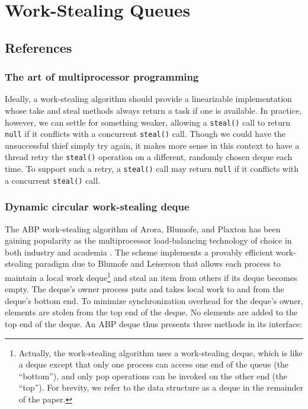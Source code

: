 
\chapter{Work-Stealing Queues}
\label{chap:queues-description}


\section{References}

\subsection{The art of multiprocessor programming \cite{Herlihy2008}}

Ideally, a work-stealing algorithm should provide a linearizable
implementation whose take and steal methods always return a task if
one is available. In practice, however, we can settle for something
weaker, allowing a \lstinline!steal()! call to return \lstinline!null!
if it conflicts with a concurrent \lstinline!steal()! call. Though we
could have the unsuccessful thief simply try again, it makes more
sense in this context to have a thread retry the \lstinline!steal()!
operation on a different, randomly chosen deque each time. To support
such a retry, a \lstinline!steal()! call may return \lstinline!null!
if it conflicts with a concurrent \lstinline!steal()! call.


\subsection{Dynamic circular work-stealing deque \cite{Chase2005}}

The ABP work-stealing algorithm of Arora, Blumofe, and Plaxton
\cite{Arora2001} has been gaining popularity as the multiprocessor
load-balancing technology of choice in both industry and academia
\cite{Arora2001, Acar2002, Blumofe1995, Frigo1998, Danaher2005}. The
scheme implements a provably efficient work-stealing paradigm due to
Blumofe and Leiserson \cite{Blumofe1999} that allows each process to
maintain a local work deque\footnote{Actually, the work-stealing
  algorithm uses a work-stealing deque, which is like a deque
  \cite{Knuth1997} except that only one process can access one end of
  the queue (the ``bottom''), and only pop operations can be invoked
  on the other end (the ``top'').  For brevity, we refer to the data
  structure as a deque in the remainder of the paper.} and steal an
item from others if its deque becomes empty. The deque's owner process
puts and takes local work to and from the deque's bottom end. To
minimize synchronization overhead for the deque's owner, elements are
stolen from the top end of the deque. No elements are added to the top
end of the deque. An ABP deque thus presents three methods in its
interface:

